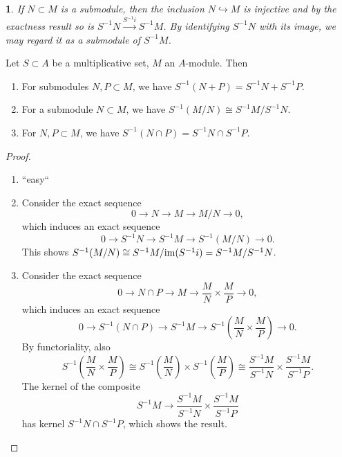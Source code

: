 \documentclass[12pt]{article}
\newtheorem{para}[theorem]{}
\begin{document}
\begin{para}
	If $N\subset M$ is a submodule, then the inclusion $N\hookrightarrow M$ is injective and by the exactness result so is $S^{-1}N\overset{S^{-1}i}{\to}S^{-1}M$. By identifying $S^{-1}N$ with its image, we may regard it as a submodule of $S^{-1}M$.
\end{para}

\begin{proposition}
	Let $S\subset A$ be a multiplicative set, $M$ an $A$-module. Then 
	\begin{enumerate}
		\item For submodules $N,P\subset M$, we have $S^{-1}(N+P)=S^{-1}N+S^{-1}P$.
		\item For a submodule $N\subset M$, we have $S^{-1}(M/N)\cong S^{-1}M/S^{-1}N$.
		\item For $N,P\subset M$, we have $S^{-1}(N\cap P)=S^{-1}N\cap S^{-1}P$.
	\end{enumerate}
\end{proposition}
\begin{proof}
	\begin{enumerate}
		\item ``easy`` 
		\item Consider the exact sequence 
			\begin{equation*}
				0 \to N \to M \to M/N \to 0,
			\end{equation*}
			which induces an exact sequence 
			\begin{equation*}
				0 \to S^{-1}N \to S^{-1}M \to S^{-1}(M/N)\to 0.
			\end{equation*}
			This shows $S^{-1}(M/N)\cong S^{-1}M/\im(S^{-1}i)=S^{-1}M/S^{-1}N$.
		\item Consider the exact sequence
			\begin{equation*}
				0 \to N\cap P \to M \to \frac{M}{N}\times \frac{M}{P} \to 0,
			\end{equation*}
			which induces an exact sequence 
			\begin{equation*}
				0 \to S^{-1}(N\cap P) \to S^{-1}M \to S^{-1}(\frac{M}{N}\times\frac{M}{P})\to 0.
			\end{equation*}
			By functoriality, also 
			\begin{equation*}
				S^{-1}(\frac{M}{N}\times\frac{M}{P}) \cong S^{-1}(\frac{M}{N})\times S^{-1}(\frac{M}{P}) \cong \frac{S^{-1}M}{S^{-1}N}\times\frac{S^{-1}M}{S^{-1}P}.
			\end{equation*}
			The kernel of the composite 
			\begin{equation*}
				S^{-1}M \to \frac{S^{-1}M}{S^{-1}N}\times\frac{S^{-1}M}{S^{-1}P}
			\end{equation*}
			has kernel $S^{-1}N\cap S^{-1}P$, which shows the result.
	\end{enumerate}
\end{proof}
\end{document}
